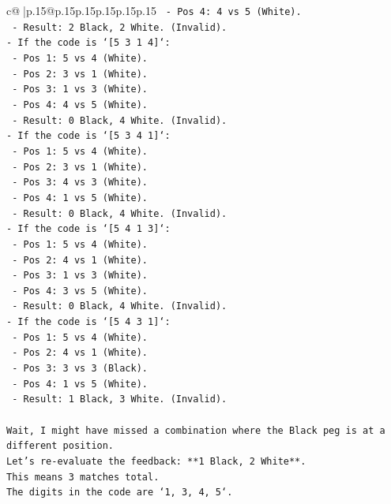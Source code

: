 \documentclass{article}
\begin{document}
{\begin{supertabular}{c@{$\;$}|p{.15\linewidth}@{}p{.15\linewidth}p{.15\linewidth}p{.15\linewidth}p{.15\linewidth}p{.15\linewidth}}
{{{\texttt{  {-} Pos 4: 4 vs 5 (White).} \\
\texttt{  {-} Result: 2 Black, 2 White. (Invalid).} \\
\texttt{{-} If the code is `{[}5 3 1 4{]}`:} \\
\texttt{  {-} Pos 1: 5 vs 4 (White).} \\
\texttt{  {-} Pos 2: 3 vs 1 (White).} \\
\texttt{  {-} Pos 3: 1 vs 3 (White).} \\
\texttt{  {-} Pos 4: 4 vs 5 (White).} \\
\texttt{  {-} Result: 0 Black, 4 White. (Invalid).} \\
\texttt{{-} If the code is `{[}5 3 4 1{]}`:} \\
\texttt{  {-} Pos 1: 5 vs 4 (White).} \\
\texttt{  {-} Pos 2: 3 vs 1 (White).} \\
\texttt{  {-} Pos 3: 4 vs 3 (White).} \\
\texttt{  {-} Pos 4: 1 vs 5 (White).} \\
\texttt{  {-} Result: 0 Black, 4 White. (Invalid).} \\
\texttt{{-} If the code is `{[}5 4 1 3{]}`:} \\
\texttt{  {-} Pos 1: 5 vs 4 (White).} \\
\texttt{  {-} Pos 2: 4 vs 1 (White).} \\
\texttt{  {-} Pos 3: 1 vs 3 (White).} \\
\texttt{  {-} Pos 4: 3 vs 5 (White).} \\
\texttt{  {-} Result: 0 Black, 4 White. (Invalid).} \\
\texttt{{-} If the code is `{[}5 4 3 1{]}`:} \\
\texttt{  {-} Pos 1: 5 vs 4 (White).} \\
\texttt{  {-} Pos 2: 4 vs 1 (White).} \\
\texttt{  {-} Pos 3: 3 vs 3 (Black).} \\
\texttt{  {-} Pos 4: 1 vs 5 (White).} \\
\texttt{  {-} Result: 1 Black, 3 White. (Invalid).} \\
\\ 
\texttt{Wait, I might have missed a combination where the Black peg is at a different position.} \\
\texttt{Let's re{-}evaluate the feedback: **1 Black, 2 White**.} \\
\texttt{This means 3 matches total.} \\
\texttt{The digits in the code are `1, 3, 4, 5`.} \\
}}}
\end{supertabular}}
\end{document}
